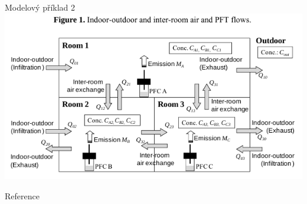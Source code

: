 \documentclass[10pt]{beamer}
\begin{document}
\begin{frame}{Modelový příklad 2}
        \centering
        \includegraphics[width=.9\textwidth]{zony2.png}
        \cite{japonci2}       
\end{frame}



\begin{frame}{Reference}
    \nocite{*}
\renewcommand*{\bibfont}{\tiny}
\printbibliography
\end{frame}
\end{document}
